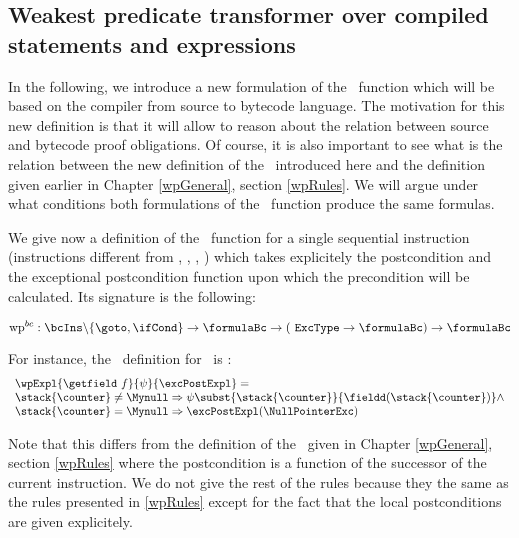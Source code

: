 
\newtheorem{wpSeq}{Definition}[subsection]
\newtheorem{wpExpr}[wpSeq]{Definition}


\subsection{Weakest predicate transformer over compiled statements and expressions} \label{pog:wpBc}
In the following, we introduce a new formulation of the \wpName \ function 
which will be based on the compiler from source to bytecode  language.
The motivation for this new definition is that it will allow to reason about the
 relation between source and bytecode proof
obligations. 
Of course, it is also important to see what is the relation between the new definition
of the \wpName \ introduced here and the definition  given earlier in Chapter \ref{wpGeneral}, section \ref{wpRules}. 
We will argue under what conditions both formulations of the \wpName \ function produce the same formulas.



 



We give now a definition of the \wpName \ function for a single sequential instruction (instructions different from \goto, \ifCond, \jsr, \ret  ) which takes
explicitely the postcondition and the exceptional postcondition function 
upon which the precondition will be calculated. Its signature is the following:

$$ \mbox{\rm\textrm{wp}}^{bc} : \bcIns \backslash \{ \goto , \ifCond \}  \rightarrow \formulaBc \rightarrow ( \mbox{ \rm \texttt{ExcType}} \rightarrow \formulaBc ) \rightarrow \formulaBc$$

For instance, the \wpName \ definition for \getfield \ is :
$$ \begin{array}{l} \wpExpl{\getfield \ f }{ \psi  }{ \excPostExpl} = \\
		         \stack{\counter } \neq \Mynull \Rightarrow 
			                \psi   \subst{ \stack{\counter} }{ \fieldd(\stack{\counter})} 		                    
			  \wedge \\
			  \stack{\counter }  = \Mynull  \Rightarrow   \excPostExpl( \NullPointerExc )
			  \end{array}$$ 

Note that this differs from the definition of the \wpName \  given in Chapter \ref{wpGeneral}, section \ref{wpRules} where the postcondition 
is a function of the successor of the current instruction. We do not give the rest of the rules because they the same as the rules presented in \ref{wpRules} except
for the fact that the local postconditions are given explicitely.

